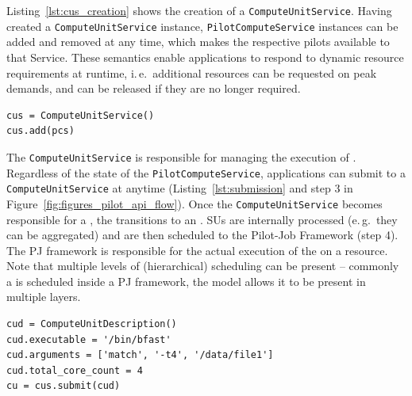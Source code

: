 \documentclass[conference]{IEEEtran}
\begin{document}
Listing~\ref{lst:cus_creation} shows the creation of
a \texttt{Compute\-Unit\-Service}.  Having created
a \texttt{Compute\-Unit\-Service} instance, \texttt{Pilot\-Compute\-Service}
instances can be added and removed at any time, which makes the respective pilots available to that Service.  These semantics enable applications to
respond to dynamic resource requirements at runtime, i.\,e.\ additional
resources can be requested on peak demands, and can be released if they are no
longer required.\\

\begin{minipage}{0.45 \textwidth}
\begin{lstlisting}[caption={\I{Instantiation
of a \texttt{ComputeUnitService} using a reference to the
\texttt{PilotComputeService}.}}, label={lst:cus_creation}]
cus = ComputeUnitService()
cus.add(pcs)
\end{lstlisting}
\end{minipage}


The \texttt{Compute\-Unit\-Service} is responsible for managing the execution of
\cus.
Regardless of the state of the \texttt{Pilot\-Compute\-Service}, applications can submit \cus to a
\texttt{Compute\-Unit\-Service} at anytime (Listing~\ref{lst:submission} and step 3
in Figure~\ref{fig:figures_pilot_api_flow}). 
Once the \texttt{Compute\-Unit\-Service} becomes responsible for a \cu, the \cu
transitions to an \su.
SUs are internally processed (e.\,g.\ they can be aggregated) and are then scheduled to the Pilot-Job Framework (step 4). 
The PJ framework is responsible for the actual execution of the \su on a
resource.
Note that multiple levels of (hierarchical) scheduling can be present -- commonly
a \su is scheduled inside a PJ framework, the model allows it to be present
in multiple layers.\\

\begin{minipage}{0.45 \textwidth}
\begin{lstlisting}[caption={\I{Instantiation and 
	submission of a \texttt{Compute\-Unit\-Description}.}}, label={lst:submission}] 
cud = ComputeUnitDescription()
cud.executable = '/bin/bfast'
cud.arguments = ['match', '-t4', '/data/file1']
cud.total_core_count = 4
cu = cus.submit(cud)
\end{lstlisting}
\end{minipage}
\end{document}
